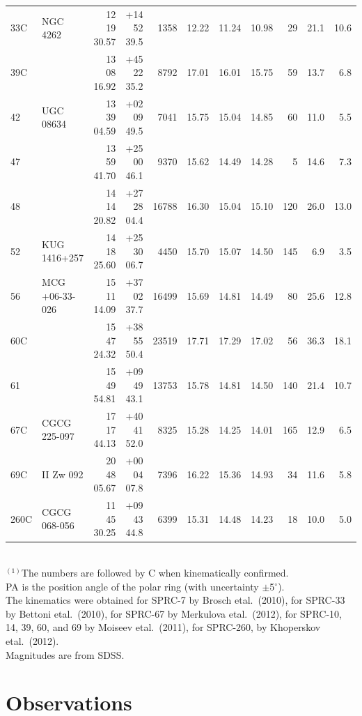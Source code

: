 \documentclass[traditabstract]{aa}
\def\ts     {\thinspace}
\def\etal   {{\rm et\ts al.}~}
\begin{document}
\begin{center}
\begin{table}
\begin{tabular}{llrrrrrrrrr}
33C&  NGC 4262  &12 19 30.57 &  +14 52 39.5 & 1358   & 12.22& 11.24 &10.98&29 &21.1 & 10.6\\
39C&            &13 08 16.92 &  +45 22 35.2 & 8792   & 17.01& 16.01 &15.75&59 &13.7 & 6.8\\
42 &  UGC 08634 &13 39 04.59 &  +02 09 49.5 &  7041  & 15.75& 15.04 &14.85&60 &11.0 & 5.5\\
47 &            &13 59 41.70 &  +25 00 46.1 &  9370  & 15.62& 14.49 &14.28&5  &14.6 & 7.3\\
48 &            &14 14 20.82 &  +27 28 04.4 & 16788  & 16.30& 15.04 &15.10&120&26.0 & 13.0\\
52 &KUG 1416+257&14 18 25.60 &  +25 30 06.7 &  4450  & 15.70& 15.07 &14.50&145& 6.9 & 3.5\\
56 &MCG +06-33-026&15 11 14.09& +37 02 37.7 & 16499  & 15.69& 14.81 &14.49&80 &25.6 & 12.8\\
60C&            &15 47 24.32 &  +38 55 50.4 & 23519  & 17.71& 17.29 &17.02&56 &36.3 & 18.1\\
61 &            &15 49 54.81 &  +09 49 43.1 & 13753  & 15.78& 14.81 &14.50&140&21.4 & 10.7\\
67C&CGCG 225-097&17 17 44.13 &  +40 41 52.0 &  8325  & 15.28& 14.25 &14.01&165&12.9 & 6.5\\
69C& II Zw 092  &20 48 05.67 &  +00 04 07.8 &  7396  & 16.22& 15.36 &14.93&34 &11.6 & 5.8\\
260C&CGCG 068-056&11 45 30.25&  +09 43 44.8 &  6399  & 15.31& 14.48 &14.23&18 &10.0 & 5.0\\
\hline
\end{tabular}
\\$^{(1)}$The numbers are followed by C when kinematically confirmed.
\\ PA is the position angle of the polar ring (with uncertainty $\pm$5$^\circ$).
\\The kinematics were obtained for SPRC-7 by Brosch \etal (2010),
for SPRC-33 by Bettoni \etal (2010),
for SPRC-67 by Merkulova  \etal (2012),
for SPRC-10, 14, 39, 60, and 69 by Moiseev \etal (2011),
for SPRC-260, by Khoperskov \etal (2012).
\\ Magnitudes are from SDSS.
\end{table}
\end{center}


\section{Observations}
\label{obs}
\end{document}

